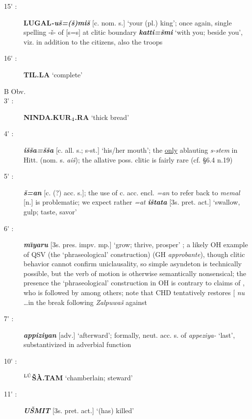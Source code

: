 \documentclass[10pt]{article}
\newcommand{\supersc}[1]{$^{\textrm{\scriptsize{#1}}}$}  	%
\newcommand{\subsc}[1]{$_{\textrm{\scriptsize{#1}}}$}	%
\newcommand{\bit}[1]{\textbf{\textit{#1}}}				%
\newcommand{\p}[1]{{\tiny[{#1}]}}					%
\newcommand{\I}{\={\i}}									%
\newcommand{\pr}{\'{ }}									%
\newcommand{\hith}{\textsubwedge{h}}
\newcommand{\man}{\supersc{L\'U}}
\renewcommand{\.}[1]{\textsubdot{#1}}
\begin{document}
\begin{description}
\item[15{\pr} :] \textbf{LUGAL}\bit{-u\v{s}=(\v{s})mi\v{s}} \p{c. nom. s.} `your (pl.) king'; once again, single spelling -\v{s}- of [s=s] at clitic boundary  \bit{katti=\v{s}mi} `with you; beside you', viz. in addition to the citizens, also the troops

\item[16{\pr} :] \textbf{TIL.LA} `complete'

\smallskip

\item[B Obv.]

\smallskip

\item[3{\pr} :] \textbf{NINDA.KUR\subsc{4}.RA} `thick bread'

\item[4{\pr} :] \bit{i\v{s}\v{s}a=\v{s}\v{s}a} \p{c. all. s.; s-st.} `his/her mouth'; the \underline{only} ablauting \textit{s-stem} in Hitt. (nom. s. \textit{ai\v{s}}); the allative poss. clitic is fairly rare (cf.  \S6.4 n.19)

\item[5{\pr} :] \bit{\v{s}=an} \p{c. (?) acc. s.}; the use of c. acc. encl. \textit{=an} to refer back to \textit{memal} \p{n.} is problematic; we expect rather \textit{=at} \bit{i\v{s}ta{\hith}ta} \p{3s. pret. act.} `swallow, gulp; taste, savor' 

\item[6{\pr} :] \bit{m{\I}yaru} \p{3s. pres. impv. mp.} `grow; thrive, prosper' ; a likely OH example of QSV (the `phraseological' construction)  (GH \textit{approbante}), though clitic behavior cannot confirm uniclausality, so simple asyndeton is technically possible, but the verb of motion is otherwise semantically nonsensical; the presence the `phraseological' construction in OH is contrary to claims of \citet{vandenhout2010phraseological}, who is followed by \citet{koller2013restructuring} among others; note that CHD tentatively restores [ \textit{nu} \ldots in the break following \textit{Zalpuwa\v{s}} against \citet{holland2007zalpa}

\item[7{\pr} :] \bit{appiziyan} \p{adv.} `afterward'; formally, neut. acc. s. of \textit{appeziya-} `last', substantivized in adverbial function

\item[10{\pr} :] \textbf{{\man}\v{S}\`A.TAM} `chamberlain; steward' 

\item[11{\pr} :] \bit{U\v{S}MIT} \p{3s. pret. act.} `(has) killed'


\end{description}
\end{document}
